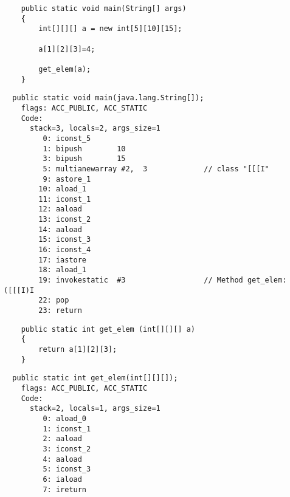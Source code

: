 

\begin{lstlisting}
	public static void main(String[] args)
	{
		int[][][] a = new int[5][10][15];

		a[1][2][3]=4;

		get_elem(a);
	}
\end{lstlisting}

\begin{lstlisting}
  public static void main(java.lang.String[]);
    flags: ACC_PUBLIC, ACC_STATIC
    Code:
      stack=3, locals=2, args_size=1
         0: iconst_5      
         1: bipush        10
         3: bipush        15
         5: multianewarray #2,  3             // class "[[[I"
         9: astore_1      
        10: aload_1       
        11: iconst_1      
        12: aaload        
        13: iconst_2      
        14: aaload        
        15: iconst_3      
        16: iconst_4      
        17: iastore       
        18: aload_1       
        19: invokestatic  #3                  // Method get_elem:([[[I)I
        22: pop           
        23: return        
\end{lstlisting}


\begin{lstlisting}
	public static int get_elem (int[][][] a)
	{
		return a[1][2][3];
	}
\end{lstlisting}

\begin{lstlisting}
  public static int get_elem(int[][][]);
    flags: ACC_PUBLIC, ACC_STATIC
    Code:
      stack=2, locals=1, args_size=1
         0: aload_0       
         1: iconst_1      
         2: aaload        
         3: iconst_2      
         4: aaload        
         5: iconst_3      
         6: iaload        
         7: ireturn       
\end{lstlisting}

